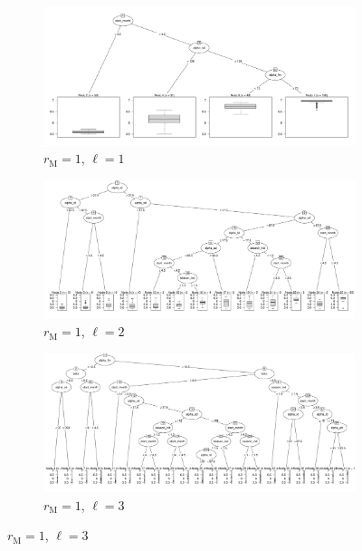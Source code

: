 \documentclass[10pt]{article}
\newcommand{\mooreRange}{r_\mathrm{M}}
\theoremstyle{definition}
\begin{document}
\begin{figure}[!ht]
    \begin{subfigure}[b]{.45\textwidth}
\includegraphics[width=\textwidth,trim={1cm 1cm 1cm 0cm},clip]{../cellular_automata/results/cart/m1_l1_tree.pdf}
\caption{$\mooreRange=1$, $\ell=1$}
    \end{subfigure}
    \begin{subfigure}[b]{.45\textwidth}
\includegraphics[width=\textwidth,trim={1cm 1cm 1cm 0cm},clip]{../cellular_automata/results/cart/m1_l2_tree.pdf}
\caption{$\mooreRange=1$, $\ell=2$}
    \end{subfigure}
    \begin{subfigure}[b]{.45\textwidth}
\includegraphics[width=\textwidth,trim={1cm 1cm 1cm 0cm},clip]{../cellular_automata/results/cart/m1_l3_tree.pdf}
\caption{$\mooreRange=1$, $\ell=3$}

\end{subfigure}
\end{figure}
\end{document}
